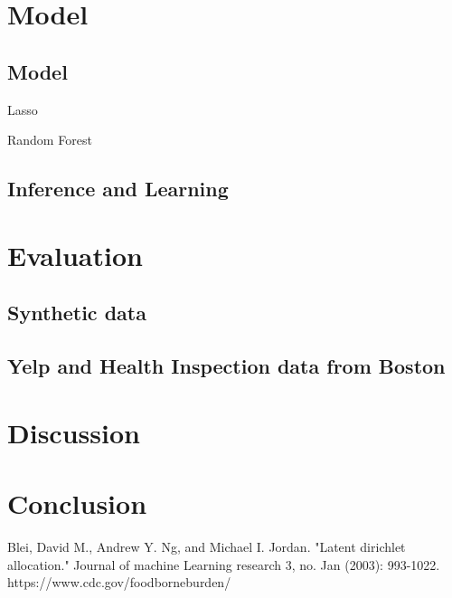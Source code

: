 \documentclass{article}
\begin{document}
\section{Model}

\subsection{Model}

Lasso

Random Forest

\subsection{Inference and Learning}

\section{Evaluation}

\subsection{Synthetic data}
\subsection{Yelp and Health Inspection data from Boston}


\section{Discussion}

\section{Conclusion}


\medskip

\small

\begin{thebibliography}{99}
 Blei, David M., Andrew Y. Ng, and Michael I. Jordan. "Latent dirichlet allocation." Journal of machine Learning research 3, no. Jan (2003): 993-1022.
 https://www.cdc.gov/foodborneburden/
\end{thebibliography}
\end{document}
